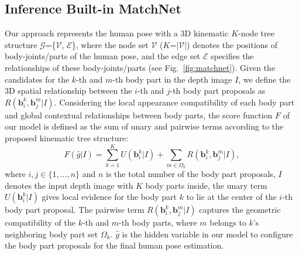 \documentclass{sig-alternate-05-2015}
\begin{document}
\subsection{Inference Built-in MatchNet} 
\label{sec:matchnet}
Our approach represents the human pose with a 3D kinematic $K$-node tree structure $\mathcal{G}$=\{$\mathcal{V}$, $\mathcal{E}$\}, where the node set $\mathcal{V}$ ($K$=$|\mathcal{V}|$) denotes the positions of body-joints/parts of the human pose, and the edge set $\mathcal{E}$ specifies the relationships of these body-joints/parts (see Fig.~\ref{fig:matchnet}). 
Given the candidates for the $k$-th and $m$-th body part in the depth image $I$, we define the 3D spatial relationship between the $i$-th and $j$-th body part proposals as $R(\textbf{b}_i^k, \textbf{b}_j^m|I)$. 
Considering the local appearance compatibility of each body part and global contextual relationships between body parts, the score function $F$ of our model is defined as the sum of unary and pairwise terms according to the proposed kinematic tree structure:
\begin{equation}
\label{equ:goal}
F(\hat{g}|I) = \sum_{k=1}^K U(\textbf{b}_i^k|I) + \sum_{m \in \Omega_k} R(\textbf{b}_i^k, \textbf{b}_j^m|I), 
\end{equation}
where $i, j \in \{1, ..., n\}$ and $n$ is the total number of the body part proposals, $I$ denotes the input depth image with $K$ body parts inside, the unary term $U(\textbf{b}_i^k|I)$ gives local evidence for the body part $k$ to lie at the center of the $i$-th body part proposal. The pairwise term $R(\textbf{b}_i^k, \textbf{b}_j^m|I)$ captures the geometric compatibility of the $k$-th and $m$-th body parts, where $m$ belongs to $k$'s neighboring body part set $\Omega_k$. $\hat{g}$ is the hidden variable in our model to configure the body part proposals for the final human pose estimation.
\end{document}
